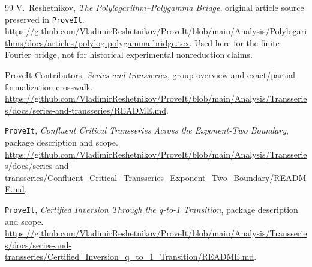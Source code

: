 \documentclass[11pt,a4paper]{article}
\numberwithin{equation}{section}
\theoremstyle{definition}\newtheorem{definition}[theorem]{Definition}
\theoremstyle{remark}\newtheorem{remark}[theorem]{Remark}
\newcommand{\repo}{\texttt{ProveIt}}
\begin{document}
\begin{thebibliography}{99}
V.~Reshetnikov, \emph{The Polylogarithm--Polygamma Bridge}, original article source preserved in \repo.
\url{https://github.com/VladimirReshetnikov/ProveIt/blob/main/Analysis/Polylogarithms/docs/articles/polylog-polygamma-bridge.tex}.
Used here for the finite Fourier bridge, not for historical experimental nonreduction claims.

ProveIt Contributors, \emph{Series and transseries}, group overview and exact/partial formalization crosswalk.
\url{https://github.com/VladimirReshetnikov/ProveIt/blob/main/Analysis/Transseries/docs/series-and-transseries/README.md}.

\repo, \emph{Confluent Critical Transseries Across the Exponent-Two Boundary}, package description and scope.
\url{https://github.com/VladimirReshetnikov/ProveIt/blob/main/Analysis/Transseries/docs/series-and-transseries/Confluent_Critical_Transseries_Exponent_Two_Boundary/README.md}.

\repo, \emph{Certified Inversion Through the q-to-1 Transition}, package description and scope.
\url{https://github.com/VladimirReshetnikov/ProveIt/blob/main/Analysis/Transseries/docs/series-and-transseries/Certified_Inversion_q_to_1_Transition/README.md}.

\end{thebibliography}
\end{document}
